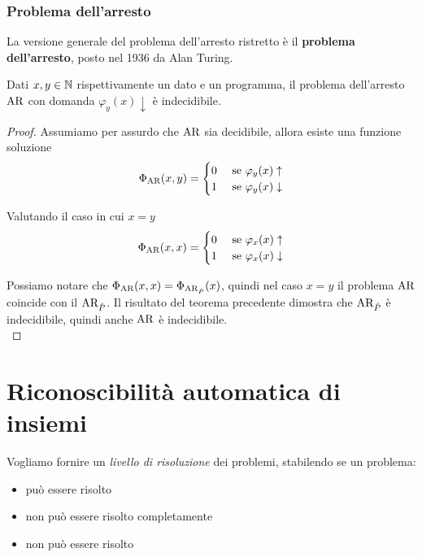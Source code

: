 \subsubsection{Problema dell'arresto}

La versione generale del problema dell'arresto ristretto è il \textbf{problema dell'arresto}, posto nel 1936 da Alan Turing.\\

\begin{theor}[Indecidibilità di $\ar$]
	Dati $x,y \in \mathbb{N}$ rispettivamente un dato e un programma, il problema dell'arresto $\ar$ con domanda $\varphi_y (x) \downarrow$ è indecidibile.
\end{theor}
\begin{proof}
	Assumiamo per assurdo che $\ar$ sia decidibile, allora esiste una funzione soluzione
	$$
	\Phi_{\text{AR}} (x,y) = \begin{cases}
		0 & \text{ se } \varphi_y (x) \uparrow \\
		1 & \text{ se } \varphi_y (x) \downarrow \\
	\end{cases}
	$$

	Valutando il caso in cui $x = y$
	$$
	\Phi_{\text{AR}} (x,x) = \begin{cases}
		0 & \text{ se } \varphi_x (x) \uparrow \\
		1 & \text{ se } \varphi_x (x) \downarrow \\
	\end{cases}
	$$

	Possiamo notare che $\Phi_{\text{AR}} (x,x) = \Phi_{\text{AR}_{\hat{P}}} (x)$, quindi nel caso $x = y$ il problema $\ar$ coincide con il $\text{AR}_{\hat{P}}$. Il risultato del teorema precedente dimostra che $\text{AR}_{\hat{P}}$ è indecidibile, quindi anche $\ar$ è indecidibile.\\
\end{proof}

\section{Riconoscibilità automatica di insiemi}

Vogliamo fornire un \textit{livello di risoluzione} dei problemi, stabilendo se un problema:
\begin{itemize}
	\item può essere risolto
	\item non può essere risolto completamente
	\item non può essere risolto
\end{itemize}

